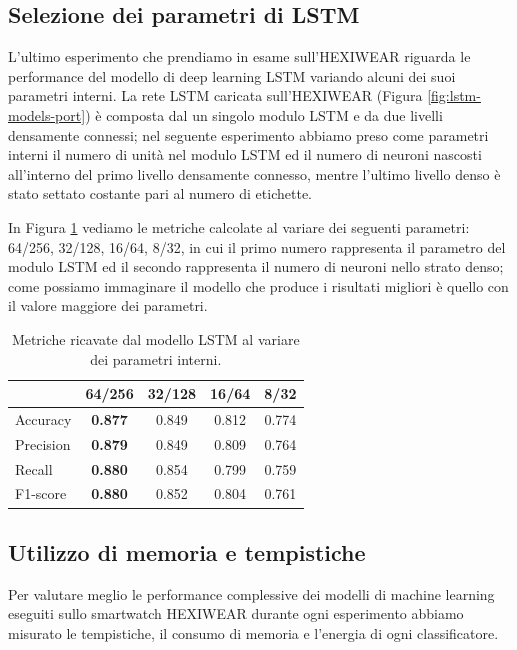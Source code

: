 \subsection{Selezione dei parametri di LSTM}
\label{ssec:selezione-dei-parametri-di-lstm-hexi}

L'ultimo esperimento che prendiamo in esame sull'HEXIWEAR riguarda le performance del modello di deep learning LSTM variando alcuni dei suoi parametri interni. 
La rete LSTM caricata sull'HEXIWEAR (Figura \ref{fig:lstm-models-port}) è composta dal un singolo modulo LSTM e da due livelli densamente connessi; nel seguente esperimento abbiamo preso come parametri interni il numero di unità nel modulo LSTM ed il numero di neuroni nascosti all'interno del primo livello densamente connesso, mentre l'ultimo livello denso è stato settato costante pari al numero di etichette. 

In Figura \ref{tab:metrics-lstm-param-hexi} vediamo le metriche calcolate al variare dei seguenti parametri: 64/256, 32/128, 16/64, 8/32, in cui il primo numero rappresenta il parametro del modulo LSTM ed il secondo rappresenta il numero di neuroni nello strato denso; come possiamo immaginare il modello che produce i risultati migliori è quello con il valore maggiore dei parametri.

\begin{table}
    \centering
    \begin{tabular}{l c c c c}
        \hline
        & 64/256 & 32/128 & 16/64 & 8/32 \\
        \hline
        Accuracy & \textbf{0.877} & 0.849 & 0.812 & 0.774 \\
        Precision & \textbf{0.879} & 0.849 & 0.809 & 0.764 \\
        Recall & \textbf{0.880} & 0.854 & 0.799 & 0.759 \\
        F1-score & \textbf{0.880} & 0.852 & 0.804 & 0.761 \\
        \hline
    \end{tabular}
    \caption{Metriche ricavate dal modello LSTM al variare dei parametri interni.}
    \label{tab:metrics-lstm-param-hexi}
\end{table}

\subsection{Utilizzo di memoria e tempistiche}
\label{ssec:utilizzo-di-memoria-e-tempistiche-hexi}

Per valutare meglio le performance complessive dei modelli di machine learning eseguiti sullo smartwatch HEXIWEAR durante ogni esperimento abbiamo misurato le tempistiche, il consumo di memoria e l'energia di ogni classificatore.

